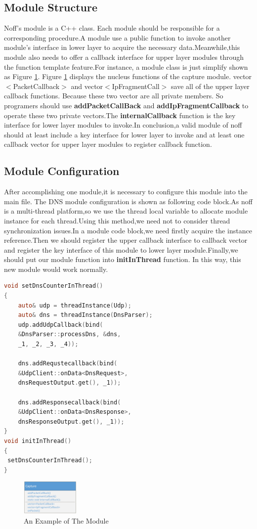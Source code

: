 \documentclass[conference]{IEEEtran}
\begin{document}
\subsection{Module Structure}
Noff's module is a C++ class. Each module should be responsible for a corresponding procedure.A module use a public function to invoke another module's interface in lower layer to acquire the necessary data.Meanwhile,this module also needs to offer a callback interface for upper layer modules through the function template feature.For instance, a module class is just simplify shown as Figure \ref{fig:4}. \newline\indent Figure \ref{fig:4} displays the nucleus functions of the capture module. vector$<$PacketCallback$>$ and vector$<$IpFragmentCall$>$ save all of the upper layer callback functions. Because these two vector are all private members. So programers should use \textbf{addPacketCallBack} and \textbf{addIpFragmentCallback} to operate these two private vectors.The \textbf{internalCallback} function is the key interface for lower layer modules to invoke.In conclusion,a valid module of noff should at least include a key interface for lower layer to invoke and at least one callback vector for upper layer modules to register callback function.
\subsection{Module Configuration}
After accomplishing one module,it is necessary to configure this module into the main file. The DNS module configuration is shown as following code block.As noff is a multi-thread platform,so we use the thread local variable to allocate module instance for each thread.Using this method,we need not to consider thread synchronization issues.In a module code block,we need firstly acquire the instance reference.Then we  should register the upper callback interface to callback vector and register the key interface of this module to lower layer module.Finally,we should put our module function into \textbf{initInThread} function. In this way, this new module would work normally.
\begin{lstlisting}[language=C]
void setDnsCounterInThread()
{
    auto& udp = threadInstance(Udp);
    auto& dns = threadInstance(DnsParser);
    udp.addUdpCallback(bind(
    &DnsParser::processDns, &dns, 
    _1, _2, _3, _4));

    dns.addRequstecallback(bind(
    &UdpClient::onData<DnsRequest>,
    dnsRequestOutput.get(), _1));

    dns.addResponsecallback(bind(
    &UdpClient::onData<DnsResponse>,
    dnsResponseOutput.get(), _1));
}
void initInThread()
{
 setDnsCounterInThread();
}
\end{lstlisting}
\begin{figure}[htbp]
  \centering
  \includegraphics[width=0.25\textwidth]{./picture/Figure4.jpg}
  \caption{An Example of The Module}
  \label{fig:4}
\end{figure}
\end{document}
